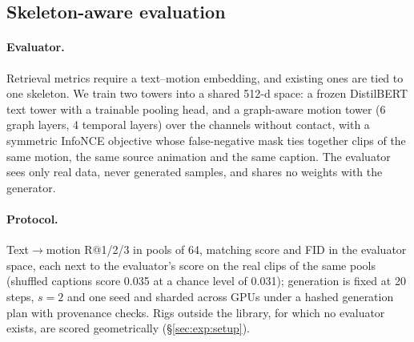 \subsection{Skeleton-aware evaluation}\label{sec:method:eval}
\paragraph{Evaluator.} Retrieval metrics require a text--motion embedding, and existing ones are
tied to one skeleton. We train two towers into a shared 512-d space: a frozen DistilBERT text tower
with a trainable pooling head, and a graph-aware motion tower (6 graph layers, 4 temporal layers)
over the \rep{} channels without contact, with a symmetric InfoNCE objective whose false-negative
mask ties together clips of the same motion, the same source animation and the same caption. The
evaluator sees only real data, never generated samples, and shares no weights with the generator.

\paragraph{Protocol.} Text$\to$motion R@1/2/3 in pools of 64, matching score and FID in the
evaluator space, each next to the evaluator's score on the real clips of the same pools (shuffled
captions score \num{0.035} at a chance level of \num{0.031}); generation is fixed at 20 steps,
$s{=}2$ and one seed and sharded across GPUs under a hashed generation plan with provenance checks.
Rigs outside the library, for which no evaluator exists, are scored geometrically
(\S\ref{sec:exp:setup}).

